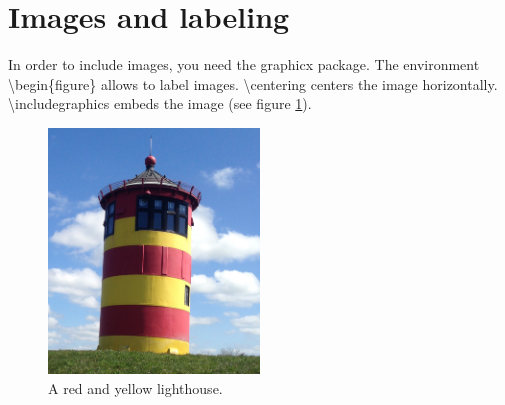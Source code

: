 \section{Images and labeling}
In order to include images, you need the graphicx package. The environment \textbackslash begin\{figure\} allows to label images. \textbackslash centering centers the image horizontally. \textbackslash includegraphics embeds the image (see figure \ref{fig:lighthouse}). 

\begin{figure}[h]
\centering
\includegraphics[width=0.5\textwidth]{img/lighthouse.jpg}
\caption{A red and yellow lighthouse.}
\label{fig:lighthouse}
\end{figure}














